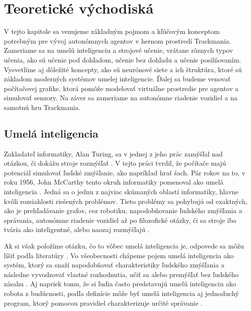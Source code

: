 \chapter{Teoretické východiská}
\label{kap:teoria}

V tejto kapitole sa venujeme základným pojmom a kľúčovým konceptom potrebným pre vývoj autonómnych agentov v hernom prostredí Trackmania. Zameriame sa na umelú inteligenciu a strojové učenie, vrátane rôznych typov učenia, ako sú učenie pod dohľadom, učenie bez dohľadu a učenie posilňovaním. Vysvetlíme aj dôležité koncepty, ako sú neurónové siete a ich štruktúra, ktoré sú základom moderných systémov umelej inteligencie. Ďalej sa budeme venovať počítačovej grafike, ktorá pomôže modelovať virtuálne prostredie pre agentov a simulovať senzory. Na záver sa zameriame na autonómne riadenie vozidiel a na samotnú hru Trackmania.

\section{Umelá inteligencia}
\label{sec:umela_inteligencia}

Zakladateľ informatiky, Alan Turing, sa v jednej z jeho prác zamýšľal nad otázkou, či dokážu stroje rozmýšľať \cite{turing_machinery_and_inteligence}. V tejto práci tvrdil, že počítače majú potenciál simulovať ľudské zmýšľanie, ako napríklad hrať šach. Pár rokov na to, v roku 1956, John McCarthy tento okruh informatiky pomenoval ako umelá inteligencia \cite{history_of_AI}. Jedná sa o jednu z najviac skúmaných oblastí informatiky, hlavne kvôli rozsiahlosti riešených problémov. Tieto problémy sa pohybujú od exaktných, ako je prehľadávanie grafov, cez robotiku, napodobňovanie ľudského zmýšľania a správania, autonómne riadenie vozidiel až po filozofické otázky, či sa stroje iba tvária ako inteligentné, alebo naozaj rozmýšľajú \cite{artificial_intelligence_modern_aproach}.

Ak si však položíme otázku, čo to vôbec umelá inteligencia je, odpovede sa môžu líšiť podľa literatúry \cite{history_of_AI, artificial_intelligence_modern_aproach, ai_in_games_brief_review}. Vo všeobecnosti chápeme pojem umelá inteligencia ako systém, ktorý sa snaží napodobňovať charakteristiky ľudského zmýšľania a následne vyvodzovať vlastné rozhodnutia, učiť sa alebo premýšľať bez ľudského zásahu \cite{artificial_intelligence_modern_aproach}. Aj napriek tomu, že si ľudia často predstavujú umelú inteligenciu ako robota z budúcnosti, podľa definície môže byť umelá inteligencia aj jednoduchý program, ktorý pomocou pravidiel charakterizuje určité správanie \cite{ai_in_games_brief_review}.


